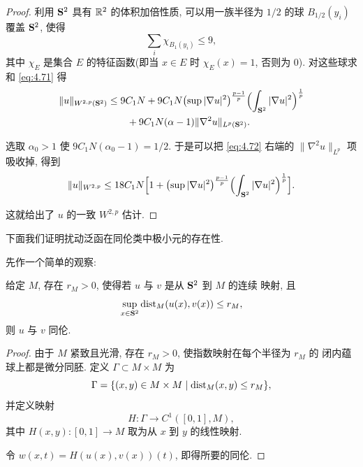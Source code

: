 \begin{proof}
利用 $\mathbf{S}^2$ 具有 $\mathbb{R}^2$ 的体积加倍性质, 可以用一族半径为 $1/2$ 的球
$B_{1/2}(y_i)$ 覆盖 $\mathbf{S}^2$, 使得
\begin{equation*}
\sum_i\chi_{B_1(y_i)}\leq9,
\end{equation*}
其中 $\chi_E$ 是集合 $E$ 的特征函数(即当 $x\in E$ 时 $\chi_E(x)=1$,
否则为 $0$). 对这些球求和 \eqref{eq:4.71} 得
\begin{equation}
\begin{aligned}
\|u\|_{W^{2,p}(\mathbf{S}^2)}
&\leq9C_1N+9C_1N\bigl(\sup|\nabla u|^2\bigr)^{\frac{p-1}{p}}
 \Bigl(\int_{\mathbf{S}^2}|\nabla u|^2\Bigr)^{\frac1p}\\
&\qquad+9C_1N(\alpha-1)\|\nabla^2u\|_{L^p(\mathbf{S}^2)}.
\end{aligned}
\label{eq:4.72}
\end{equation}

选取 $\alpha_0>1$ 使 $9C_1N(\alpha_0-1)=1/2$. 于是可以把 \eqref{eq:4.72}
右端的 $\|\nabla^2u\|_{L^p}$ 项吸收掉, 得到
\begin{equation}
\|u\|_{W^{2,p}}\leq18C_1N\Bigl[1+\bigl(\sup|\nabla u|^2\bigr)
 ^{\frac{p-1}{p}}\Bigl(\int_{\mathbf{S}^2}|\nabla u|^2\Bigr)^{\frac1p}\Bigr].
\label{eq:4.73}
\end{equation}

这就给出了 $u$ 的一致 $W^{2,p}$ 估计.
\end{proof}

下面我们证明扰动泛函在同伦类中极小元的存在性.

先作一个简单的观察:

\begin{lemma}
\label{lem:4.30}
给定 $M$, 存在 $r_M>0$, 使得若 $u$ 与 $v$ 是从 $\mathbf{S}^2$ 到 $M$ 的连续
映射, 且
\begin{equation*}
\sup_{x\in\mathbf{S}^2}\operatorname{dist}_M(u(x),v(x))\leq r_M,
\end{equation*}
则 $u$ 与 $v$ 同伦.
\end{lemma}

\begin{proof}
由于 $M$ 紧致且光滑, 存在 $r_M>0$, 使指数映射在每个半径为 $r_M$ 的
闭内蕴球上都是微分同胚. 定义 $\Gamma\subset M\times M$ 为
\begin{equation*}
\Gamma=\{(x,y)\in M\times M\mid\operatorname{dist}_M(x,y)\leq r_M\},
\end{equation*}
并定义映射
\begin{equation*}
H:\Gamma\to C^1([0,1],M),
\end{equation*}
其中 $H(x,y):[0,1]\to M$ 取为从 $x$ 到 $y$ 的线性映射.

令 $w(x,t)=H(u(x),v(x))(t)$, 即得所要的同伦.
\end{proof}

